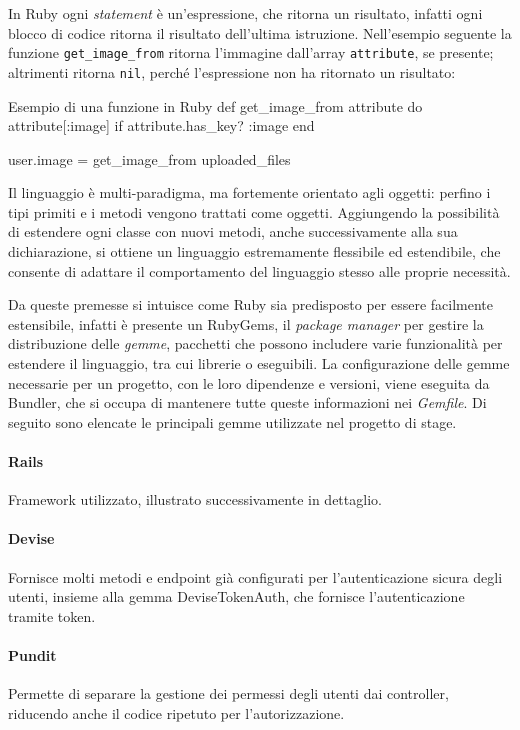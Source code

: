 \noindent In Ruby ogni \emph{statement} è un'espressione, che ritorna un risultato, infatti ogni blocco di codice ritorna il risultato dell'ultima istruzione. Nell'esempio seguente la funzione \verb|get_image_from| ritorna l'immagine dall'array \verb|attribute|, se presente; altrimenti ritorna \verb|nil|, perché l'espressione non ha ritornato un risultato:
\begin{code}{Esempio di una funzione in Ruby}
	def get_image_from attribute do
		attribute[:image] if attribute.has_key? :image
	end

	user.image = get_image_from uploaded_files
\end{code}

\noindent Il linguaggio è multi-paradigma, ma fortemente orientato agli oggetti: perfino i tipi primiti e i metodi vengono trattati come oggetti. Aggiungendo la possibilità di estendere ogni classe con nuovi metodi, anche successivamente alla sua dichiarazione, si ottiene un linguaggio estremamente flessibile ed estendibile, che consente di adattare il comportamento del linguaggio stesso alle proprie necessità.

Da queste premesse si intuisce come Ruby sia predisposto per essere facilmente estensibile, infatti è presente un RubyGems, il \emph{package manager} per gestire la distribuzione delle \emph{gemme}, pacchetti che possono includere varie funzionalità per estendere il linguaggio, tra cui librerie o eseguibili. La configurazione delle gemme necessarie per un progetto, con le loro dipendenze e versioni, viene eseguita da Bundler, che si occupa di mantenere tutte queste informazioni nei \emph{Gemfile}. Di seguito sono elencate le principali gemme utilizzate nel progetto di stage.
\paragraph{Rails} Framework utilizzato, illustrato successivamente in dettaglio.
\paragraph{Devise} Fornisce molti metodi e endpoint già configurati per l'autenticazione sicura degli utenti, insieme alla gemma DeviseTokenAuth, che fornisce l'autenticazione tramite token.
\paragraph{Pundit} Permette di separare la gestione dei permessi degli utenti dai controller, riducendo anche il codice ripetuto per l'autorizzazione.

